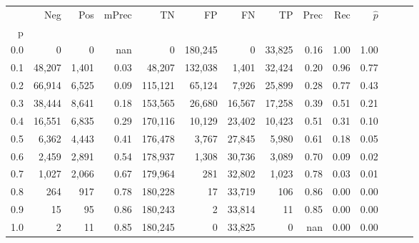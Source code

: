 \begin{tabular}{rrrrrrrrrrrrrr}
\toprule
{} &     Neg &    Pos & mPrec &       TN &       FP &      FN &      TP &  Prec &   Rec & $\hat{p}$ \\
p   &         &        &       &          &          &         &         &       &       &           \\
\midrule
0.0 &       0 &      0 &   nan &        0 &  180,245 &       0 &  33,825 &  0.16 &  1.00 &      1.00 \\
0.1 &  48,207 &  1,401 &  0.03 &   48,207 &  132,038 &   1,401 &  32,424 &  0.20 &  0.96 &      0.77 \\
0.2 &  66,914 &  6,525 &  0.09 &  115,121 &   65,124 &   7,926 &  25,899 &  0.28 &  0.77 &      0.43 \\
0.3 &  38,444 &  8,641 &  0.18 &  153,565 &   26,680 &  16,567 &  17,258 &  0.39 &  0.51 &      0.21 \\
0.4 &  16,551 &  6,835 &  0.29 &  170,116 &   10,129 &  23,402 &  10,423 &  0.51 &  0.31 &      0.10 \\
0.5 &   6,362 &  4,443 &  0.41 &  176,478 &    3,767 &  27,845 &   5,980 &  0.61 &  0.18 &      0.05 \\
0.6 &   2,459 &  2,891 &  0.54 &  178,937 &    1,308 &  30,736 &   3,089 &  0.70 &  0.09 &      0.02 \\
0.7 &   1,027 &  2,066 &  0.67 &  179,964 &      281 &  32,802 &   1,023 &  0.78 &  0.03 &      0.01 \\
0.8 &     264 &    917 &  0.78 &  180,228 &       17 &  33,719 &     106 &  0.86 &  0.00 &      0.00 \\
0.9 &      15 &     95 &  0.86 &  180,243 &        2 &  33,814 &      11 &  0.85 &  0.00 &      0.00 \\
1.0 &       2 &     11 &  0.85 &  180,245 &        0 &  33,825 &       0 &   nan &  0.00 &      0.00 \\
\bottomrule
\end{tabular}
